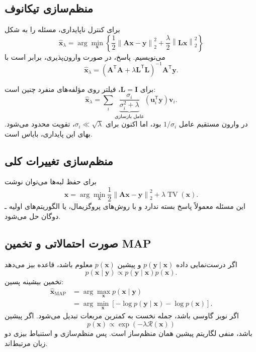 \documentclass[12pt,openany,oneside]{book}
\newcommand{\norm}[1]{\left\lVert #1\right\rVert}
\newcommand{\trans}{^{\mathsf T}}
\newcommand{\vect}[1]{\bm{#1}}
\begin{document}
\subsection{منظم‌سازی تیکانوف}

برای کنترل ناپایداری، مسئله را به شکل
\begin{equation}
\widehat{\vect x}_\lambda
=\arg\min_{\vect x}
\left\{
\frac12\norm{\vect A\vect x-\vect y}_2^2
+\frac{\lambda}{2}\norm{\vect L\vect x}_2^2
\right\}
\label{eq:tikhonov}
\end{equation}
می‌نویسیم. پاسخ، در صورت وارون‌پذیری، برابر است با
\begin{equation}
\widehat{\vect x}_\lambda
=(\vect A\trans\vect A+\lambda\vect L\trans\vect L)^{-1}\vect A\trans\vect y.
\end{equation}

برای \(\vect L=\vect I\)، فیلتر روی مؤلفه‌های منفرد چنین است:
\begin{equation}
\widehat{\vect x}_\lambda
=\sum_i
\underbrace{\frac{\sigma_i}{\sigma_i^2+\lambda}}_{\text{عامل بازسازی}}
(\vect u_i\trans\vect y)\vect v_i.
\end{equation}
در وارون مستقیم عامل \(1/\sigma_i\) بود، اما اکنون برای \(\sigma_i\ll\sqrt\lambda\)،
تقویت محدود می‌شود. بهای این پایداری، بایاس است.

\subsection{منظم‌سازی تغییرات کلی}

برای حفظ لبه‌ها می‌توان نوشت
\begin{equation}
\widehat{\vect x}
=\arg\min_{\vect x}
\frac12\norm{\vect A\vect x-\vect y}_2^2
+\lambda\operatorname{TV}(\vect x).
\label{eq:tv}
\end{equation}
این مسئله معمولاً پاسخ بسته ندارد و با روش‌های پروگزیمال،  یا الگوریتم‌های اولیه ـ دوگان حل می‌شود.

\subsection{صورت احتمالاتی و تخمین MAP}

اگر درست‌نمایی داده \(p(\vect y\mid\vect x)\) و پیشین \(p(\vect x)\) معلوم باشد،
قاعده بیز می‌دهد
\begin{equation}
p(\vect x\mid\vect y)
\propto p(\vect y\mid\vect x)p(\vect x).
\end{equation}
تخمین بیشینه پسین:
\begin{align}
\widehat{\vect x}_{\mathrm{MAP}}
&=\arg\max_{\vect x}p(\vect x\mid\vect y)\\
&=\arg\min_{\vect x}
\left[-\log p(\vect y\mid\vect x)-\log p(\vect x)\right].
\end{align}
اگر نویز گاوسی باشد، جمله نخست به کمترین مربعات تبدیل می‌شود. اگر پیشین
\begin{equation}
p(\vect x)\propto\exp(-\lambda\mathcal R(\vect x))
\end{equation}
باشد، منفی لگاریتم پیشین همان منظم‌ساز است. پس منظم‌سازی و استنباط بیزی دو زبان مرتبط‌اند.
\end{document}
